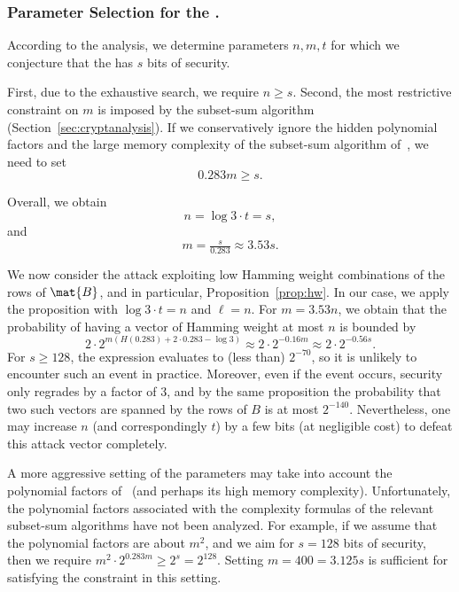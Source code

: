 \subsubsection{Parameter Selection for the \ttOWF.}
According to the analysis, we determine parameters $n,m,t$ for which
we conjecture that the \ttOWF has $s$ bits of security.

First, due to the exhaustive search, we require $n \geq s$.
Second,
the most restrictive constraint on $m$ is imposed by the subset-sum algorithm (Section~\ref{sec:cryptanalysis}).
If we conservatively ignore the hidden polynomial factors and the large memory
complexity of the subset-sum algorithm of~\cite{BonnetainBSS20}, we need to set
$$0.283m \geq s.$$

Overall, we obtain
$$n = \log 3 \cdot t = s,$$
and $$m = \tfrac{s}{0.283} \approx 3.53 s.$$

We now consider the attack exploiting low Hamming weight combinations of the rows of $\mat{B}$,
and in particular, Proposition~\ref{prop:hw}.
In our case, we apply the proposition with $\log 3 \cdot t = n$ and $\ell = n$.
For $m = 3.53 n$, we obtain that the probability of having a vector of Hamming weight at most $n$ is bounded by
$$2 \cdot 2^{m (H(0.283) + 2 \cdot 0.283 - \log 3)} \approx 2 \cdot 2^{-0.16m} \approx 2 \cdot 2^{- 0.56 s}.$$
For $s \geq 128$, the expression evaluates to (less than) $2^{-70}$, so it is unlikely to encounter such an event in practice.
Moreover, even if the event occurs, security only regrades by a factor of 3, and by the same
proposition the probability that two such vectors are spanned by the rows of $B$ is at most $2^{-140}$.
Nevertheless, one may increase $n$ (and correspondingly $t$)
by a few bits (at negligible cost) to defeat this attack vector completely.

A more aggressive setting of the parameters may take into account the polynomial factors of~\cite{BonnetainBSS20} (and perhaps its high memory complexity). Unfortunately, the polynomial factors associated with the complexity formulas of the relevant subset-sum algorithms have not been analyzed.
For example, if we assume that the polynomial factors are about $m^2$, and we aim for $s = 128$ bits of security, then
we require $m^2 \cdot 2^{0.283m} \geq 2^{s} = 2^{128}$. Setting $m = 400 = 3.125 s$ is sufficient for satisfying the constraint in this setting.



